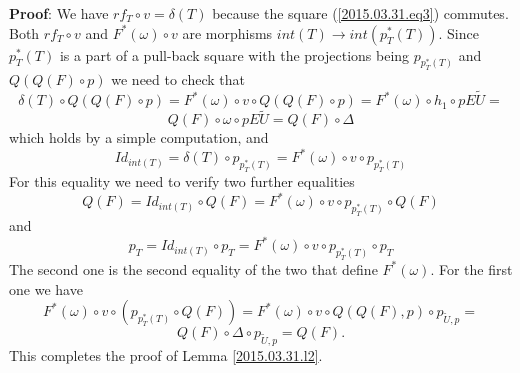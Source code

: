 \documentclass[12pt]{article}
\newenvironment{myproof}{{\bf Proof}:}{\vskip 5mm }
\newcommand{\sr}{\rightarrow}
\newcommand{\wt}{\widetilde}
\begin{document}
\begin{myproof}
We have $rf_T\circ v=\delta(T)$ because the square (\ref{2015.03.31.eq3}) commutes.  Both $rf_T\circ v$ and $F^*(\omega)\circ v$ are morphisms $int(T)\sr int(p_T^*(T))$. Since $p_T^*(T)$ is a part of a pull-back square with the projections being $p_{p_T^*(T)}$ and $Q(Q(F)\circ p)$ we need to check that
%
$$\delta(T)\circ Q(Q(F)\circ p)=  F^*(\omega)\circ v\circ Q(Q(F)\circ p)=F^*(\omega)\circ h_1\circ pE\wt{U}=$$
$$Q(F)\circ \omega \circ pE\wt{U}=Q(F)\circ \Delta$$
%
which holds by a simple computation, and
%
$$Id_{int(T)}=\delta(T)\circ p_{p_T^*(T)}=F^*(\omega)\circ v\circ p_{p_T^*(T)}$$
%
For this equality we need to verify two further equalities
%
$$Q(F)=Id_{int(T)}\circ Q(F)=F^*(\omega)\circ v\circ p_{p_T^*(T)}\circ Q(F)$$
%
and
%
$$p_T=Id_{int(T)}\circ p_T=F^*(\omega)\circ v\circ p_{p_T^*(T)}\circ p_T$$
%
The second one is the second equality of the two that define $F^*(\omega)$. For the first one we have
%
$$F^*(\omega)\circ v\circ (p_{p_T^*(T)}\circ Q(F))=F^*(\omega)\circ v\circ Q(Q(F),p)\circ p_{\wt{U},p}=$$
$$Q(F)\circ \Delta\circ p_{\wt{U},p}=Q(F).$$
%
This completes the proof of Lemma \ref{2015.03.31.l2}.
\end{myproof}
%
 
\end{document}
